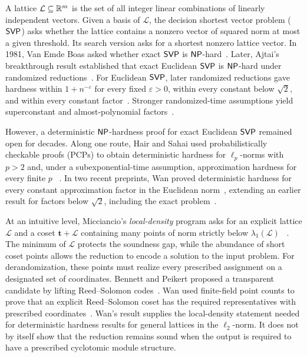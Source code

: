 A lattice $\mathcal L\subseteq\mathbb R^m$ is the set of all integer linear
combinations of linearly independent vectors.  Given a basis of
$\mathcal L$, the decision shortest vector problem ($\mathsf{SVP}$) asks whether
the lattice contains a nonzero vector of squared norm at most a given
threshold.  Its search version asks for a shortest nonzero lattice vector.
In 1981, Van Emde Boas asked whether exact
$\mathsf{SVP}$ is $\mathsf{NP}$-hard~\cite{vanEmdeBoas81}.  Later, Ajtai's breakthrough
result established that exact Euclidean $\mathsf{SVP}$ is $\mathsf{NP}$-hard under randomized
reductions~\cite{Ajtai98}.  For Euclidean $\mathsf{SVP}$, later randomized
reductions gave hardness within $1+n^{-\varepsilon}$ for every fixed
$\varepsilon>0$, within every constant below $\sqrt2$, and within every
constant factor~\cite{cai1998approximating,Micciancio01,Khot05,Micciancio12}.
Stronger randomized-time assumptions yield superconstant and
almost-polynomial factors~\cite{Khot05,HavivRegev12}.

However, a deterministic
$\mathsf{NP}$-hardness proof for exact Euclidean $\mathsf{SVP}$ remained open for decades.
Along one route, Hair and Sahai used probabilistically checkable
proofs (PCPs) to obtain deterministic hardness for
$\ell_p$-norms with $p>2$ and, under a subexponential-time assumption,
approximation hardness for every finite $p$
~\cite{HairSahai26STOC,HairSahai26FOCS}.  In two recent preprints,
Wan proved deterministic hardness for every constant approximation factor in
the Euclidean norm~\cite{wan2026euclidean}, extending an earlier result for
factors below $\sqrt2$, including the exact problem~\cite{wan2026np}.

At an intuitive level, Micciancio's \emph{local-density} program asks
for an explicit lattice $\mathcal L$ and a coset $\mathbf t+\mathcal L$
containing many points of norm strictly below $\lambda_1(\mathcal L)$
~\cite{Micciancio01,Micciancio12}.  The minimum of $\mathcal L$
protects the soundness gap, while the abundance of short coset points allows
the reduction to encode a solution to the input problem.  For derandomization,
these points must realize every prescribed assignment on a designated set of
coordinates.  Bennett and Peikert proposed a transparent candidate by lifting
Reed--Solomon codes~\cite{BennettPeikert23}.  Wan used finite-field point
counts to prove that an explicit Reed--Solomon coset has the required
representatives with prescribed coordinates~\cite{wan2026np}.  Wan's
result supplies the local-density statement needed for deterministic
hardness results for general lattices in the $\ell_2$-norm.  It does not by itself
show that the reduction remains sound when the output is required to have
a prescribed cyclotomic module structure.

